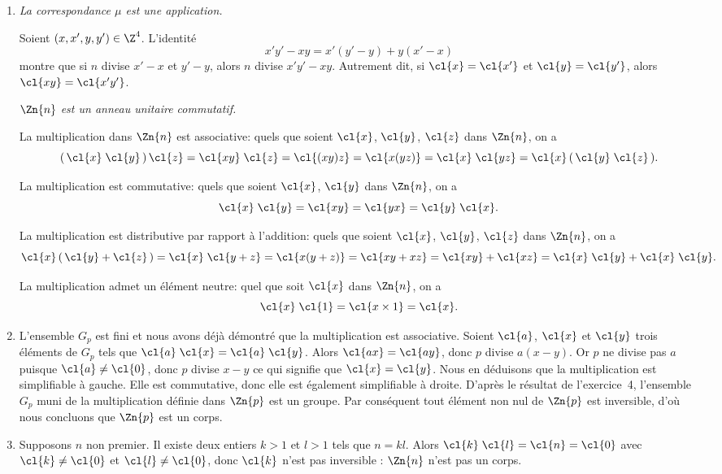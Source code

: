\begin{enumerate}
  \item
    \emph{La correspondance $\mu$ est une application.}

    Soient $(x,x',y,y')\in\Z^4$.
    L'identité
    \[
      x'y' - xy = x'(y' - y) + y(x' - x)
    \]
    montre que si $n$ divise $x' - x$ et $y' - y$, alors $n$ divise $x'y' - xy$.
    Autrement dit, si $\cl{x} = \cl{x'}$ et $\cl{y} = \cl{y'}$, alors $\cl{xy} = \cl{x'y'}$.

    \emph{$\Zn{n}$ est un anneau unitaire commutatif.}

    La multiplication dans $\Zn{n}$ est associative: quels que soient $\cl{x}$, $\cl{y}$, $\cl{z}$ dans $\Zn{n}$, on a
    \[
      (\,\cl{x}\;\cl{y}\,)\,\cl{z}
        = \cl{xy}\;\cl{z}
        = \cl{(xy)z}
        = \cl{x(yz)}
        = \cl{x}\;\cl{yz}
        = \cl{x}\,(\,\cl{y}\;\cl{z}\,).
    \]

    La multiplication est commutative: quels que soient $\cl{x}$, $\cl{y}$ dans $\Zn{n}$, on a
    \[
      \cl{x}\;\cl{y} = \cl{xy} = \cl{yx} = \cl{y}\;\cl{x}.
    \]

    La multiplication est distributive par rapport à l'addition: quels que soient $\cl{x}$, $\cl{y}$, $\cl{z}$ dans $\Zn{n}$, on a
    \[
      \cl{x}\,(\,\cl{y} + \cl{z}\,)
        = \cl{x}\;\cl{y + z}
        = \cl{x(y + z)}
        = \cl{xy + xz}
        = \cl{xy} + \cl{xz}
        = \cl{x}\;\cl{y} + \cl{x}\;\cl{y}.
    \]

    La multiplication admet un élément neutre: quel que soit $\cl{x}$ dans $\Zn{n}$, on a
    \[
      \cl{x}\;\cl{1} = \cl{x\times 1} = \cl{x}.
    \]

  \item
    L'ensemble $G_p$ est fini et nous avons déjà démontré que la multiplication est associative.
    Soient $\cl{a}$, $\cl{x}$ et $\cl{y}$ trois éléments de $G_p$ tels que $\cl{a}\;\cl{x} = \cl{a}\;\cl{y}$.
    Alors $\cl{ax} = \cl{ay}$, donc $p$ divise $a(x-y)$.
    Or $p$ ne divise pas $a$ puisque $\cl{a}\neq\cl{0}$, donc $p$ divise $x - y$ ce qui signifie que $\cl{x} = \cl{y}$.
    Nous en déduisons que la multiplication est simplifiable à gauche.
    Elle est commutative, donc elle est également simplifiable à droite.
    D'après le résultat de l'exercice~4, l'ensemble $G_p$ muni de la multiplication définie dans $\Zn{p}$ est un groupe.
    Par conséquent tout élément non nul de $\Zn{p}$ est inversible, d'où nous concluons que $\Zn{p}$ est un corps.

  \item
    Supposons $n$ non premier.
    Il existe deux entiers $k > 1$ et $l > 1$ tels que $n = kl$.
    Alors $\cl{k}\;\cl{l} = \cl{n} = \cl{0}$  avec $\cl{k}\neq \cl{0}$ et $\cl{l}\neq \cl{0}$, donc $\cl{k}$ n'est pas inversible : $\Zn{n}$ n'est pas un corps.
\end{enumerate}
